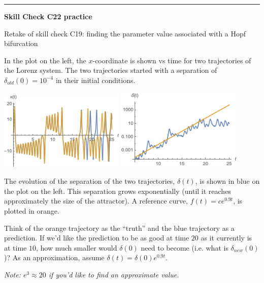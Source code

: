 \documentclass[12pt,letterpaper,noanswers]{exam}
\begin{document}
\vspace{0.2cm}
\hrule
\vspace{0.2cm}


\noindent\textbf{Skill Check C22 practice}
\begin{questions}
\item Retake of skill check C19: finding the parameter value associated with a Hopf bifurcation


\item In the plot on the left, the $x$-coordinate is shown vs time for two trajectories of the Lorenz system.  The two trajectories started with a separation of $\delta_{old}(0) = 10^{-4}$ in their initial conditions.

\includegraphics[width=0.45\textwidth]{img/C24-2019-11-01p1.png}\hfill
\includegraphics[width=0.45\textwidth]{img/C24-2019-11-01p2.png}

The evolution of the separation of the two trajectories, $\delta(t)$, is shown in blue on the plot on the left.  This separation grows exponentially (until it reaches approximately the size of the attractor).  A reference curve, $f(t) = ce^{0.9t}$, is plotted in orange. 


Think of the orange trajectory as the ``truth'' and the blue trajectory as a prediction.  If we'd like the prediction to be as good at time $20$ as it currently is at time $10$, how much smaller would $\delta(0)$ need to become (i.e. what is $\delta_{new}(0)$)?  As an approximation, assume $\delta(t) =\delta(0) e^{0.9t}$.

\emph{Note: $e^3\approx 20$ if you'd like to find an approximate value.}

\end{questions}
\end{document}
